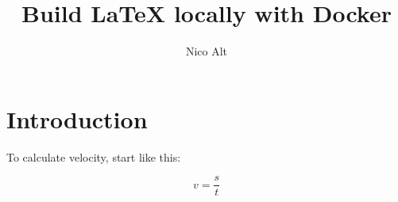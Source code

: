 \documentclass[
	english,
	accentcolor=9c,
	type=intern,
	marginpar=false
	]{tudapub}
\begin{document}
\title{Build LaTeX locally with Docker}
\author{Nico Alt}

\maketitle

\section{Introduction}

To calculate velocity, start like this:

\begin{equation*}
v = \frac{s}{t}
\end{equation*}
\end{document}
